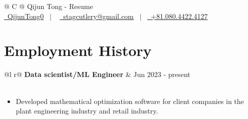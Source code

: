 \documentclass[a4paper,12pt]{article}
\begin{document}
\pagestyle{empty} 



\begin{tabularx}{\linewidth}{@{} C @{}}
\Huge{Qijun Tong - Resume} \\[7.5pt]
\href{https://github.com/QijunTong0}{\raisebox{-0.05\height}\faGithub\ QijunTong0} \ $|$ \ 
\href{stagcutlery@gmail.com}{\raisebox{-0.05\height}\faEnvelope \ stagcutlery@gmail.com} \ $|$ \ 
\href{tel:+8108044224127}{\raisebox{-0.05\height}\faMobile \ +81.080.4422.4127} \\
\end{tabularx}



\section{Employment History}

\begin{tabularx}{\linewidth}{ @{}l r@{} }
\textbf{Data scientist/ML Engineer} & \hfill Jun 2023 - present \\[3.75pt]
  \\
\end{tabularx}
\begin{itemize}
    \item Developed mathematical optimization software for client companies in the plant engineering industry and retail industry.
\end{itemize}
\end{document}
